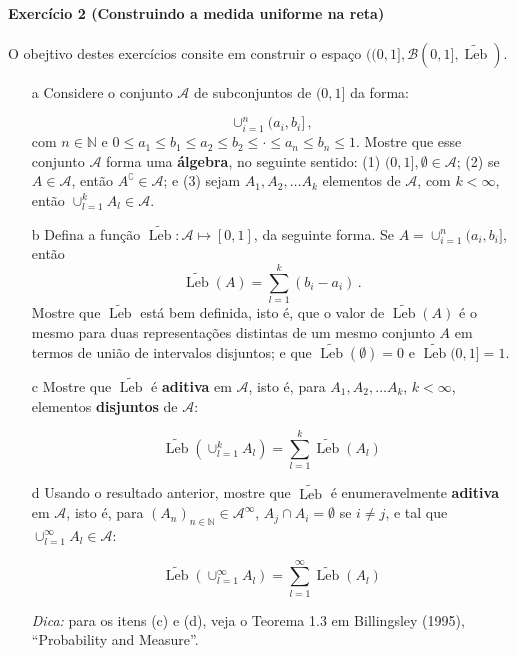 \documentclass[10pt,a4paper]{article}
\begin{document}
	\paragraph{Exercício 2 (Construindo a medida uniforme na reta)} O obejtivo destes exercícios consite em construir o espaço $((0,1],\mathcal{B}(0,1], \widetilde{\operatorname{Leb}})$.
	\begin{itemize}
		\item[a] Considere o conjunto $\mathcal{A}$ de subconjuntos de $(0,1]$ da forma:
		
		$$\cup_{i=1}^n (a_i,b_i]\, ,$$
		com $n \in \mathbb{N}$ e $0\leq a_1\leq b_1 \leq a_2\leq b_2 \leq \cdot \leq a_n \leq b_n \leq 1$. Mostre que esse conjunto $\mathcal{A}$ forma uma \textbf{álgebra}, no seguinte sentido: (1) $(0,1], \emptyset \in \mathcal{A}$; (2) se $A\in \mathcal{A}$, então $A^\complement \in \mathcal{A}$; e (3) sejam $A_1, A_2, \ldots A_k$ elementos de $\mathcal{A}$, com $k <\infty$, então $\cup_{l=1}^k A_l \in \mathcal{A}$.
		\item[b] Defina a função ${\widetilde{\operatorname{Leb}}}: \mathcal{A}\mapsto [0,1]$, da seguinte forma. Se $A = \cup_{i=1}^n (a_i,b_i]$, então
		$${\widetilde{\operatorname{Leb}}}(A) = \sum_{l=1}^k (b_i - a_i)\, .$$
		Mostre que $\widetilde{\operatorname{Leb}}$ está bem definida, isto é, que o valor de ${\widetilde{\operatorname{Leb}}}(A)$ é o mesmo para duas representações distintas de um mesmo conjunto $A$ em termos de união de intervalos disjuntos; e que ${\widetilde{\operatorname{Leb}}}(\emptyset) = 0$ e ${\widetilde{\operatorname{Leb}}}(0,1]=1$.
		
		\item[c] Mostre que ${\widetilde{\operatorname{Leb}}}$ é \textbf{aditiva} em $\mathcal{A}$, isto é, para $A_1, A_2, \ldots A_k$, $k <\infty$, elementos \textbf{disjuntos} de $\mathcal{A}$:
		
		$$\widetilde{\operatorname{Leb}}(\cup_{l=1}^k A_l) = \sum_{l=1}^k \widetilde{\operatorname{Leb}}(A_l)$$
		\item[d] Usando o resultado anterior, mostre que   $\widetilde{\operatorname{Leb}}$ é enumeravelmente \textbf{aditiva} em $\mathcal{A}$, isto é, para  $(A_n)_{n \in \mathbb{N}} \in \mathcal{A}^\infty$, $A_j \cap A_i = \emptyset$ se $i \neq j$, {\color{red}e tal que $\cup_{l=1}^\infty A_l \in \mathcal{A}$}:
		
		$$\widetilde{\operatorname{Leb}}(\cup_{l=1}^\infty A_l) = \sum_{l=1}^\infty \widetilde{\operatorname{Leb}}(A_l)$$
		
		\textit{Dica:} para os itens (c) e (d), veja o Teorema 1.3 em Billingsley (1995), ``Probability and Measure''.
		

\end{itemize}
\end{document}
